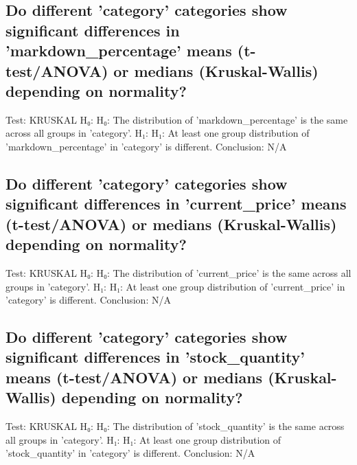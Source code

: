 \documentclass{article}%
\begin{document}
%
\subsection{Do different 'category' categories show significant differences in 'markdown\_percentage' means (t{-}test/ANOVA) or medians (Kruskal{-}Wallis) depending on normality?}%
\label{subsec:Dodifferentcategorycategoriesshowsignificantdifferencesinmarkdownpercentagemeans(t{-}test/ANOVA)ormedians(Kruskal{-}Wallis)dependingonnormality?}%
Test: KRUSKAL\newline%
H₀: H₀: The distribution of 'markdown\_percentage' is the same across all groups in 'category'.\newline%
H₁: H₁: At least one group distribution of 'markdown\_percentage' in 'category' is different.\newline%
Conclusion: N/A

%
\subsection{Do different 'category' categories show significant differences in 'current\_price' means (t{-}test/ANOVA) or medians (Kruskal{-}Wallis) depending on normality?}%
\label{subsec:Dodifferentcategorycategoriesshowsignificantdifferencesincurrentpricemeans(t{-}test/ANOVA)ormedians(Kruskal{-}Wallis)dependingonnormality?}%
Test: KRUSKAL\newline%
H₀: H₀: The distribution of 'current\_price' is the same across all groups in 'category'.\newline%
H₁: H₁: At least one group distribution of 'current\_price' in 'category' is different.\newline%
Conclusion: N/A

%
\subsection{Do different 'category' categories show significant differences in 'stock\_quantity' means (t{-}test/ANOVA) or medians (Kruskal{-}Wallis) depending on normality?}%
\label{subsec:Dodifferentcategorycategoriesshowsignificantdifferencesinstockquantitymeans(t{-}test/ANOVA)ormedians(Kruskal{-}Wallis)dependingonnormality?}%
Test: KRUSKAL\newline%
H₀: H₀: The distribution of 'stock\_quantity' is the same across all groups in 'category'.\newline%
H₁: H₁: At least one group distribution of 'stock\_quantity' in 'category' is different.\newline%
Conclusion: N/A
\end{document}
